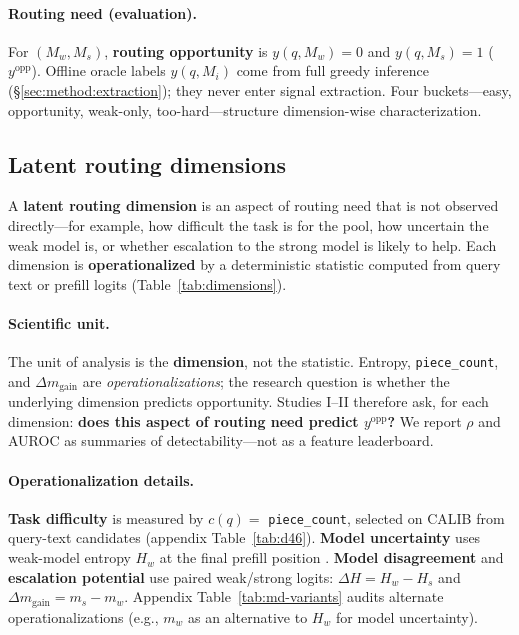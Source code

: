 \paragraph{Routing need (evaluation).}
For $(M_w,M_s)$, \textbf{routing opportunity} is $y(q,M_w)=0$ and $y(q,M_s)=1$ ($y^{\text{opp}}$).
Offline oracle labels $y(q,M_i)$ come from full greedy inference (\S\ref{sec:method:extraction}); they never enter signal extraction.
Four buckets---easy, opportunity, weak-only, too-hard---structure dimension-wise characterization.

\subsection{Latent routing dimensions}
\label{sec:method:dimensions}

A \textbf{latent routing dimension} is an aspect of routing need that is not observed directly---for example, how difficult the task is for the pool, how uncertain the weak model is, or whether escalation to the strong model is likely to help.
Each dimension is \textbf{operationalized} by a deterministic statistic computed from query text or prefill logits (Table~\ref{tab:dimensions}).

\paragraph{Scientific unit.}
The unit of analysis is the \textbf{dimension}, not the statistic.
Entropy, \texttt{piece\_count}, and $\Delta m_{\mathrm{gain}}$ are \emph{operationalizations}; the research question is whether the underlying dimension predicts opportunity.
Studies I--II therefore ask, for each dimension: \textbf{does this aspect of routing need predict $y^{\text{opp}}$?}
We report $\rho$ and AUROC as summaries of detectability---not as a feature leaderboard.



\paragraph{Operationalization details.}
\textbf{Task difficulty} is measured by $c(q)=$ \texttt{piece\_count}, selected on CALIB from query-text candidates (appendix Table~\ref{tab:d46}).
\textbf{Model uncertainty} uses weak-model entropy $H_w$ at the final prefill position \citep{he2023uncertainty,plaut2024chat}.
\textbf{Model disagreement} and \textbf{escalation potential} use paired weak/strong logits: $\Delta H = H_w - H_s$ and $\Delta m_{\mathrm{gain}} = m_s - m_w$.
Appendix Table~\ref{tab:md-variants} audits alternate operationalizations (e.g., $m_w$ as an alternative to $H_w$ for model uncertainty).

